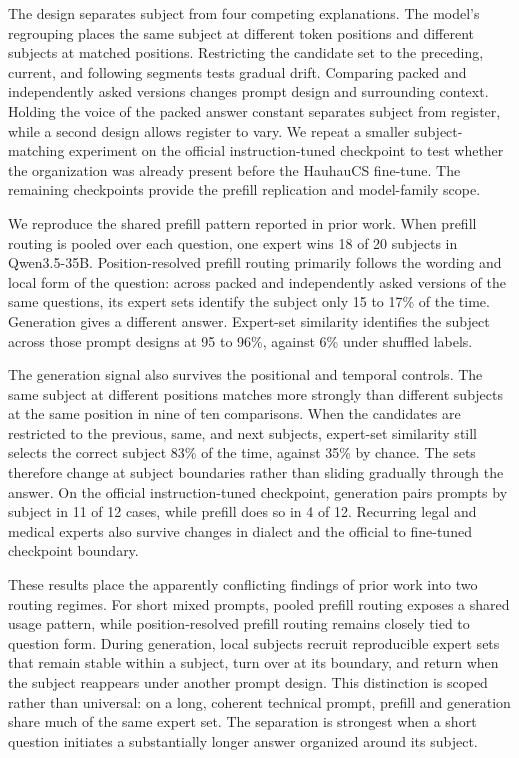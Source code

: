 The design separates subject from four competing explanations. The model's regrouping places the same subject at different token positions and different subjects at matched positions. Restricting the candidate set to the preceding, current, and following segments tests gradual drift. Comparing packed and independently asked versions changes prompt design and surrounding context. Holding the voice of the packed answer constant separates subject from register, while a second design allows register to vary. We repeat a smaller subject-matching experiment on the official instruction-tuned checkpoint to test whether the organization was already present before the HauhauCS fine-tune. The remaining checkpoints provide the prefill replication and model-family scope.

We reproduce the shared prefill pattern reported in prior work. When prefill routing is pooled over each question, one expert wins 18 of 20 subjects in Qwen3.5-35B. Position-resolved prefill routing primarily follows the wording and local form of the question: across packed and independently asked versions of the same questions, its expert sets identify the subject only 15 to 17\% of the time. Generation gives a different answer. Expert-set similarity identifies the subject across those prompt designs at 95 to 96\%, against 6\% under shuffled labels.

The generation signal also survives the positional and temporal controls. The same subject at different positions matches more strongly than different subjects at the same position in nine of ten comparisons. When the candidates are restricted to the previous, same, and next subjects, expert-set similarity still selects the correct subject 83\% of the time, against 35\% by chance. The sets therefore change at subject boundaries rather than sliding gradually through the answer. On the official instruction-tuned checkpoint, generation pairs prompts by subject in 11 of 12 cases, while prefill does so in 4 of 12. Recurring legal and medical experts also survive changes in dialect and the official to fine-tuned checkpoint boundary.

These results place the apparently conflicting findings of prior work into two routing regimes. For short mixed prompts, pooled prefill routing exposes a shared usage pattern, while position-resolved prefill routing remains closely tied to question form. During generation, local subjects recruit reproducible expert sets that remain stable within a subject, turn over at its boundary, and return when the subject reappears under another prompt design. This distinction is scoped rather than universal: on a long, coherent technical prompt, prefill and generation share much of the same expert set. The separation is strongest when a short question initiates a substantially longer answer organized around its subject.

